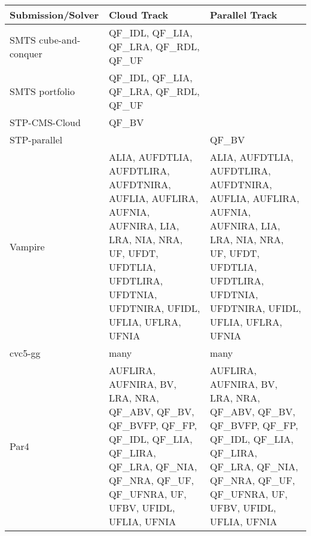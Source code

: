 \documentclass{scrartcl}
\begin{document}
\begin{tabular}{ | p{.3\linewidth} | p{.3\linewidth} | p{.3\linewidth} | }
    \hline
    Submission/Solver & Cloud Track & Parallel Track \\
    \hline\hline
    SMTS cube-and-conquer & \tiny QF\_IDL, QF\_LIA, QF\_LRA, QF\_RDL, QF\_UF & \\
    \hline
    SMTS portfolio & \tiny QF\_IDL, QF\_LIA, QF\_LRA, QF\_RDL, QF\_UF & \\
    \hline
    STP-CMS-Cloud & \tiny QF\_BV & \\
    \hline
    STP-parallel & & \tiny QF\_BV \\
    \hline
    Vampire &
    \tiny
    ALIA, AUFDTLIA, AUFDTLIRA, AUFDTNIRA, AUFLIA, AUFLIRA, AUFNIA, AUFNIRA,
    LIA, LRA, NIA, NRA, UF, UFDT, UFDTLIA, UFDTLIRA, UFDTNIA, UFDTNIRA, UFIDL, UFLIA,
    UFLRA, UFNIA &
    \tiny
    ALIA, AUFDTLIA, AUFDTLIRA, AUFDTNIRA, AUFLIA, AUFLIRA, AUFNIA, AUFNIRA,
    LIA, LRA, NIA, NRA, UF, UFDT, UFDTLIA, UFDTLIRA, UFDTNIA, UFDTNIRA, UFIDL, UFLIA,
    UFLRA, UFNIA \\
    \hline
    cvc5-gg & many & many \\
    \hline
    Par4 &
    \tiny
    AUFLIRA, AUFNIRA, BV, LRA, NRA, QF\_ABV, QF\_BV, QF\_BVFP, QF\_FP, QF\_IDL, QF\_LIA,
    QF\_LIRA, QF\_LRA, QF\_NIA, QF\_NRA, QF\_UF, QF\_UFNRA, UF, UFBV, UFIDL, UFLIA, UFNIA &
    \tiny
    AUFLIRA, AUFNIRA, BV, LRA, NRA, QF\_ABV, QF\_BV, QF\_BVFP, QF\_FP, QF\_IDL, QF\_LIA,
    QF\_LIRA, QF\_LRA, QF\_NIA, QF\_NRA, QF\_UF, QF\_UFNRA, UF, UFBV, UFIDL, UFLIA, UFNIA \\
    \hline
\end{tabular}
\end{document}
